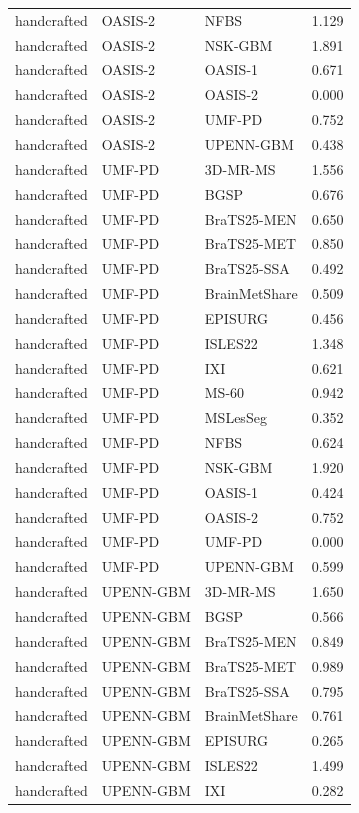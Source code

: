 \begin{tabular}{lllr}
handcrafted & OASIS-2 & NFBS & 1.129 \\
handcrafted & OASIS-2 & NSK-GBM & 1.891 \\
handcrafted & OASIS-2 & OASIS-1 & 0.671 \\
handcrafted & OASIS-2 & OASIS-2 & 0.000 \\
handcrafted & OASIS-2 & UMF-PD & 0.752 \\
handcrafted & OASIS-2 & UPENN-GBM & 0.438 \\
handcrafted & UMF-PD & 3D-MR-MS & 1.556 \\
handcrafted & UMF-PD & BGSP & 0.676 \\
handcrafted & UMF-PD & BraTS25-MEN & 0.650 \\
handcrafted & UMF-PD & BraTS25-MET & 0.850 \\
handcrafted & UMF-PD & BraTS25-SSA & 0.492 \\
handcrafted & UMF-PD & BrainMetShare & 0.509 \\
handcrafted & UMF-PD & EPISURG & 0.456 \\
handcrafted & UMF-PD & ISLES22 & 1.348 \\
handcrafted & UMF-PD & IXI & 0.621 \\
handcrafted & UMF-PD & MS-60 & 0.942 \\
handcrafted & UMF-PD & MSLesSeg & 0.352 \\
handcrafted & UMF-PD & NFBS & 0.624 \\
handcrafted & UMF-PD & NSK-GBM & 1.920 \\
handcrafted & UMF-PD & OASIS-1 & 0.424 \\
handcrafted & UMF-PD & OASIS-2 & 0.752 \\
handcrafted & UMF-PD & UMF-PD & 0.000 \\
handcrafted & UMF-PD & UPENN-GBM & 0.599 \\
handcrafted & UPENN-GBM & 3D-MR-MS & 1.650 \\
handcrafted & UPENN-GBM & BGSP & 0.566 \\
handcrafted & UPENN-GBM & BraTS25-MEN & 0.849 \\
handcrafted & UPENN-GBM & BraTS25-MET & 0.989 \\
handcrafted & UPENN-GBM & BraTS25-SSA & 0.795 \\
handcrafted & UPENN-GBM & BrainMetShare & 0.761 \\
handcrafted & UPENN-GBM & EPISURG & 0.265 \\
handcrafted & UPENN-GBM & ISLES22 & 1.499 \\
handcrafted & UPENN-GBM & IXI & 0.282 \\

\end{tabular}
